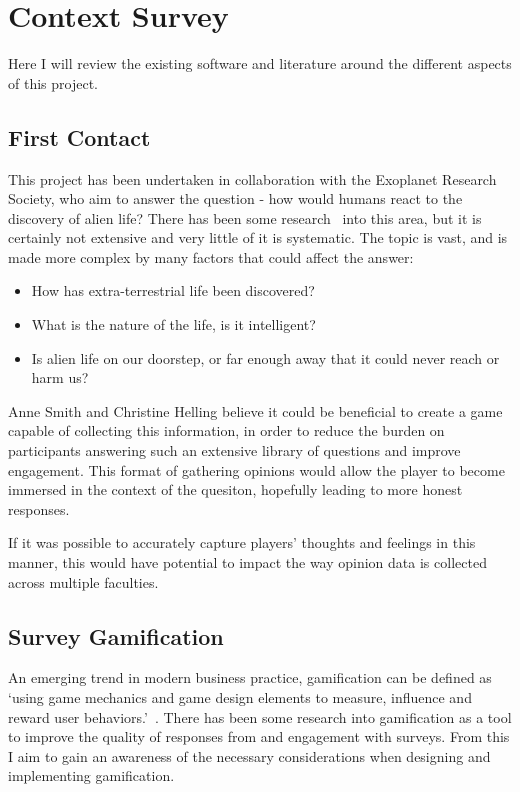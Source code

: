 \chapter{Context Survey}

Here I will review the existing software and literature around the different aspects of this project. 


\section{First Contact}
This project has been undertaken in collaboration with the Exoplanet Research Society, who aim to answer the question - how would humans react to the discovery of alien life?
There has been some research~\cite{ReactionsToMessage, HowReactDiscovery, Fear} into this area, but it is certainly not extensive and very little of it is systematic. The topic is vast, and is made more complex by many factors that could affect the answer:
\begin{itemize}
    \item How has extra-terrestrial life been discovered?
    \item What is the nature of the life, is it intelligent?
    \item Is alien life on our doorstep, or far enough away that it could never reach or harm us?
\end{itemize}
Anne Smith and Christine Helling believe it could be beneficial to create a game capable of collecting this information, in order to reduce the burden on participants answering such an extensive library of questions and improve engagement. This format of gathering opinions would allow the player to become immersed in the context of the quesiton, hopefully leading to more honest responses.

If it was possible to accurately capture players' thoughts and feelings in this manner, this would have potential to impact the way opinion data is collected across multiple faculties.

\section{Survey Gamification}
An emerging trend in modern business practice, gamification can be defined as `using game mechanics and game design elements to measure, influence and reward user behaviors.'~\cite{7804551}. 
There has been some research into gamification as a tool to improve the quality of responses from and engagement with surveys. From this I aim to gain an awareness of the necessary considerations when designing and implementing gamification.

